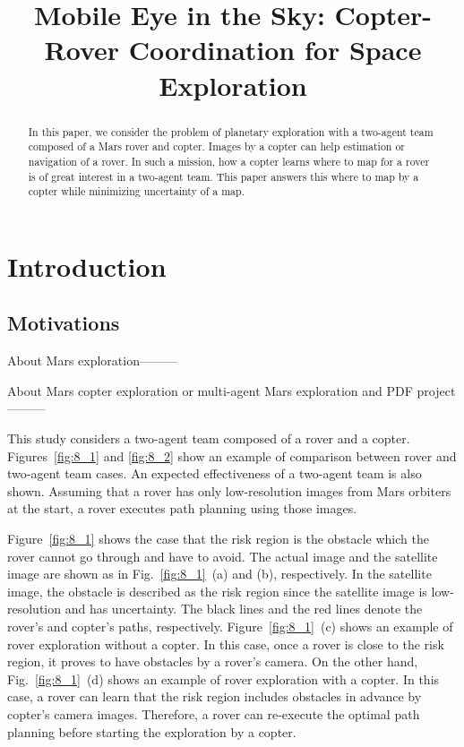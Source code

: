 \documentclass[conference]{IEEEtran}
\begin{document}
\title{\huge Mobile Eye in the Sky: Copter-Rover Coordination for Space Exploration}


\maketitle

\begin{abstract}
In this paper, we consider the problem of planetary exploration with a two-agent team composed of a Mars rover and copter. Images by a copter can help estimation or navigation of a rover. In such a mission, how a copter learns where to map for a rover is of great interest in a two-agent team. 
This paper answers this where to map by a copter while minimizing uncertainty of a map.
\end{abstract}

\IEEEpeerreviewmaketitle

\section{Introduction}
\subsection*{Motivations}
About Mars exploration---------

About Mars copter exploration or multi-agent Mars exploration and PDF project---------

This study considers a two-agent team composed of a rover and a copter. Figures~\ref{fig:8_1} and \ref{fig:8_2} show an example of comparison between rover and two-agent team cases. An expected effectiveness of a two-agent team is also shown. Assuming that a rover has only low-resolution images from Mars orbiters at the start, a rover executes path planning using those images.

Figure~\ref{fig:8_1} shows the case that the risk region is the obstacle which the rover cannot go through and have to avoid. The actual image and the satellite image are shown as in Fig.~\ref{fig:8_1}~(a) and (b), respectively. In the satellite image, the obstacle is described as the risk region since the satellite image is low-resolution and has uncertainty. The black lines and the red lines denote the rover’s and copter’s paths, respectively. Figure~\ref{fig:8_1}~(c) shows an example of rover exploration without a copter. In this case, once a rover is close to the risk region, it proves to have obstacles by a rover’s camera. On the other hand, Fig.~\ref{fig:8_1}~(d) shows an example of rover exploration with a copter. In this case, a rover can learn that the risk region includes obstacles in advance by copter’s camera images. Therefore, a rover can re-execute the optimal path planning before starting the exploration by a copter.
\end{document}
